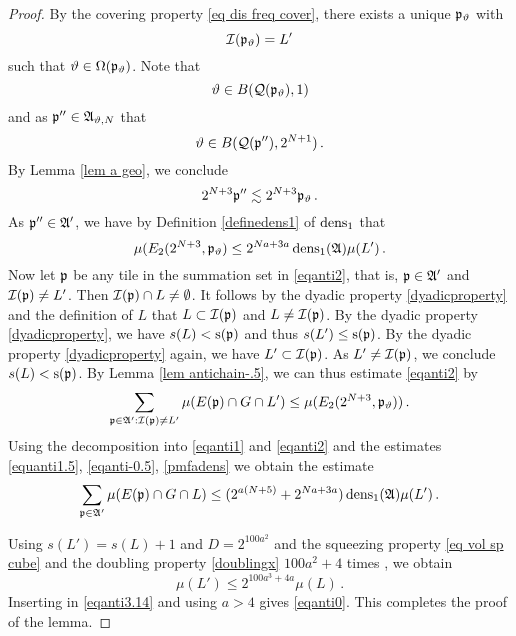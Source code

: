 {\begin{proof}
By the covering property \eqref{eq dis freq cover}, there exists a unique $\mathfrak p_{\vartheta}$ with
\begin{equation*}
    \mathcal{I}(\mathfrak p_{\vartheta})=L'
\end{equation*}
such that $\vartheta\in \Omega(\mathfrak p_{\vartheta})$.
Note that
\begin{equation}
    \vartheta\in B(\mathcal{Q}(\mathfrak p_{\vartheta}), 1)
\end{equation}
and as  $\mathfrak p'' \in \mathfrak{A}_{\vartheta,N}$ that
\begin{equation}
    \vartheta \in B(\mathcal{Q}(\mathfrak p''), 2^{N+1})\, .
\end{equation}
By Lemma \ref{lem a geo}, we conclude
\begin{equation}
    2^{N+3}\mathfrak p''  \lesssim  2^{N+3}\mathfrak p_{\vartheta} \, .
\end{equation}
As $\mathfrak p''\in \mathfrak{A}'$, we have by Definition
\eqref{definedens1} of $\operatorname{\operatorname{dens}}_1$ that
\begin{equation}\label{pmfadens}
   {\mu(E_2(2^{N+3}, \mathfrak p_{\vartheta})}\le 2^{Na+3a}\operatorname{\operatorname{dens}}_1(\mathfrak{A}) {\mu(L')}\, .
\end{equation}
Now let $\mathfrak p$ be any tile in the summation set in \eqref{eqanti2}, that is, $\mathfrak p\in \mathfrak{A}'$ and $\mathcal{I}(\mathfrak p)\neq L'$.
Then $\mathcal{I}(\mathfrak p)\cap L\neq \emptyset$. It follows by the dyadic property \eqref{dyadicproperty}
and the definition of $L$ that
$L\subset \mathcal{I}(\mathfrak p)$ and $L\neq \mathcal{I}(\mathfrak p)$. By the dyadic property \eqref{dyadicproperty}, we have
$s(L)<\mathrm{s}(\mathfrak p)$ and thus $s(L')\le \mathrm{s}(\mathfrak p)$. By the dyadic property
   \eqref{dyadicproperty} again, we have $L'\subset \mathcal{I}(\mathfrak p)$.
As $L'\neq \mathcal{I}(\mathfrak p)$, we conclude $s(L)<\mathrm{s}(\mathfrak p)$.
By Lemma \ref{lem antichain-.5}, we can thus estimate \eqref{eqanti2} by
\begin{equation}\label{eqanti0.5}
    \sum_{\mathfrak p\in\mathfrak{A}':\mathcal{I}(\mathfrak p)\neq L'}\mu(E(\mathfrak p)\cap G\cap L')
    \le  \mu (E_2(2^{N+3},\mathfrak p_{\vartheta}))\, .
\end{equation}
Using the decomposition
into \eqref{eqanti1} and
\eqref{eqanti2} and the estimates
\eqref{equanti1.5},
\eqref{eqanti-0.5},
\eqref{pmfadens} we obtain the estimate
\begin{equation}\label{eqanti3.14}
\sum_{\mathfrak p\in\mathfrak{A}'}\mu(E(\mathfrak p)\cap G \cap L)
    \le (2^{a(N+5)}+2^{Na+3a})\operatorname{\operatorname{dens}}_1(\mathfrak{A})\mu(L')\,.
\end{equation}

Using $s(L')=s(L)+1$ and $D=2^{100a^2}$ and the
squeezing property \eqref{eq vol sp cube}
and the doubling property \eqref{doublingx} $100a^2+4$ times , we obtain
\begin{equation}
    \mu(L')\le 2^{100a^3+4a}\mu(L)\, .
\end{equation}
Inserting in \eqref{eqanti3.14} and using $a>4$ gives \eqref{eqanti0}.
This completes the proof of the lemma.
\end{proof}



}
